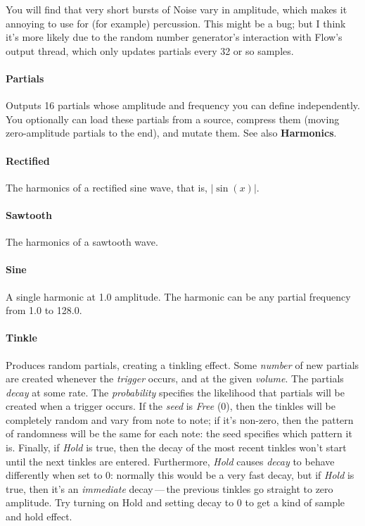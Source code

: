 \documentclass{article}
\begin{document}
You will find that very short bursts of Noise vary in amplitude, which makes it annoying to use for (for example) percussion.  This might be a bug; but I think it's more likely due to the random number generator's interaction with Flow's output thread, which only updates partials every 32 or so samples.

\paragraph{Partials}  Outputs 16 partials whose amplitude and frequency you can define independently.  You optionally can load these partials from a source, compress them (moving zero-amplitude partials to the end), and mutate them.  See also {\bf Harmonics}.


\paragraph{Rectified}  The harmonics of a rectified sine wave, that is, \(|\sin(x)|\).

\paragraph{Sawtooth}  The harmonics of a sawtooth wave.

\paragraph{Sine}  A single harmonic at 1.0 amplitude.  The harmonic can be any partial frequency from 1.0 to 128.0.

\paragraph{Tinkle}  Produces random partials, creating a tinkling effect.  Some {\it number} of new partials are created whenever the {\it trigger} occurs, and at the given {\it volume}.  The partials {\it decay} at some rate.  The {\it probability} specifies the likelihood that partials will be created when a trigger occurs.   If the {\it seed} is {\it Free} (0), then the tinkles will be completely random and vary from note to note; if it's non-zero, then the pattern of randomness will be the same for each note: the seed specifies which pattern it is.  Finally, if {\it Hold} is true, then the decay of the most recent tinkles won't start until the next tinkles are entered.  Furthermore, {\it Hold} causes {\it decay} to behave differently when set to 0: normally this would be a very fast decay, but if {\it Hold} is true, then it's an {\it immediate} decay\,---\,the previous tinkles go straight to zero amplitude.  Try turning on Hold and setting decay to 0 to get a kind of sample and hold effect.
\end{document}
